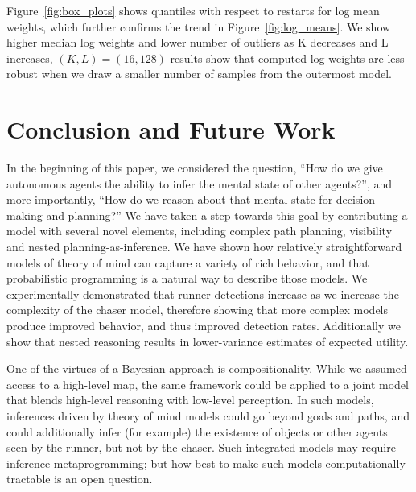 \documentclass[twoside]{article}
\begin{document}
Figure~\ref{fig:box_plots} shows quantiles with respect to restarts for log mean weights, which further confirms the trend in Figure~\ref{fig:log_means}. We show higher median log weights and lower number of outliers as K decreases and L increases,  $(K,L)=(16,128)$ results show that computed log weights are less robust when we draw a smaller number of samples from the outermost model. 




\vskip -0.1in
\section{Conclusion and Future Work}
\vskip -0.1in

In the beginning of this paper, we considered the question, ``How do we give autonomous agents the ability to infer the mental state of other agents?'', and more importantly, ``How do we reason about that mental state for decision making and planning?'' 
We have taken a step towards this goal by contributing a model with several novel elements, including complex path planning, visibility and nested planning-as-inference.
We %
have shown how relatively straightforward models of theory of mind can capture a variety of rich behavior, and that probabilistic programming is a natural way to describe those models. 
We experimentally demonstrated that runner detections increase as we increase the complexity of the chaser model, therefore showing that more complex models produce improved behavior, and thus improved detection rates. Additionally we show that nested reasoning results in lower-variance estimates of expected utility.

One of the virtues of a Bayesian approach is compositionality.  While
we assumed access to a high-level map, the same framework could be
applied to a joint model that blends high-level reasoning with
low-level perception.  In such models, inferences driven by theory of
mind models could go beyond goals and paths, and could additionally
infer (for example) the existence of objects or other agents seen by
the runner, but not by the chaser.  Such integrated models may
require inference metaprogramming; but how best to make
such models computationally tractable is an open question.
\end{document}
